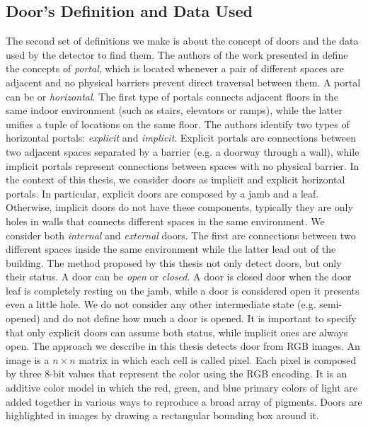 \subsection{Door's Definition and Data Used} 

The second set of definitions we make is about the concept of doors and the data used by the detector to find them. The authors of the work presented in \cite{topologyurban} define the concepts of \textit{portal}, which is located whenever a pair of different spaces are adjacent and no physical barriers prevent direct traversal between them.  A portal can be  or \textit{horizontal}. The first type of portals connects adjacent floors in the same indoor environment (such as stairs, elevators or ramps), while the latter unifies a tuple of locations on the same floor. The authors identify two types of horizontal portals: \textit{explicit} and \textit{implicit}. Explicit portals are connections between two adjacent spaces separated by a barrier (e.g. a doorway through a wall), while implicit portals represent connections between spaces with no physical barrier. In the context of this thesis, we consider doors as implicit and explicit horizontal portals. In particular, explicit doors are composed by a jamb and a leaf. Otherwise, implicit doors do not have these components, typically they are only holes in walls that connects different spaces in the same environment. We consider both \textit{internal} and \textit{external} doors. The first are connections between two different spaces inside the same environment while the latter lead out of the building. The method proposed by this thesis not only detect doors, but only their status. A door can be \textit{open} or \textit{closed}. A door is closed door when the door leaf is completely resting on the jamb, while a door is considered open it presents even a little hole. We do not consider any other intermediate state (e.g. semi-opened) and do not define how much a door is opened. It is important to specify that only explicit doors can assume both status, while implicit ones are always open. The approach we describe in this thesis detects door from RGB images. An image is a $n \times n$ matrix in which each cell is called pixel. Each pixel is composed by three 8-bit values that represent the color using the RGB encoding. It is an additive color model in which the red, green, and blue primary colors of light are added together in various ways to reproduce a broad array of pigments. Doors are highlighted in images by drawing a rectangular bounding box around it.

